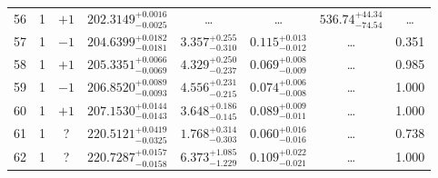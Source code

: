 \begin{table*}[!]
\begin{tabular}{llcrrlrc}
56 & 1 &  $+1$ & $    202.3149_{-      0.0025}^{+      0.0016}$ & \multicolumn{1}{c}{\dots} & \multicolumn{1}{c}{\dots} & $      536.74_{-       74.54}^{+       44.34}$ & \dots \\[1pt]
57 & 1 & $-1$ & $    204.6399_{-      0.0181}^{+      0.0182}$ & $       3.357_{-       0.310}^{+       0.255}$ & $       0.115_{-       0.012}^{+       0.013}$ & \multicolumn{1}{c}{\dots} & 0.351\\[1pt]
58 & 1 & $+1$ & $    205.3351_{-      0.0069}^{+      0.0066}$ & $       4.329_{-       0.237}^{+       0.250}$ & $       0.069_{-       0.009}^{+       0.008}$ & \multicolumn{1}{c}{\dots} & 0.985\\[1pt]
59 & 1 & $-1$ & $    206.8520_{-      0.0093}^{+      0.0089}$ & $       4.556_{-       0.215}^{+       0.231}$ & $       0.074_{-       0.008}^{+       0.006}$ & \multicolumn{1}{c}{\dots} & 1.000\\[1pt]
60 & 1 & $+1$ & $    207.1530_{-      0.0143}^{+      0.0144}$ & $       3.648_{-       0.145}^{+       0.186}$ & $       0.089_{-       0.011}^{+       0.009}$ & \multicolumn{1}{c}{\dots} & 1.000\\[1pt]

61 & 1 & ? & $    220.5121_{-      0.0325}^{+      0.0419}$ & $       1.768_{-       0.303}^{+       0.314}$ & $       0.060_{-       0.016}^{+       0.016}$ & \multicolumn{1}{c}{\dots} & 0.738\\[1pt]
62 & 1 & ? & $    220.7287_{-      0.0158}^{+      0.0157}$ & $       6.373_{-       1.229}^{+       1.085}$ & $       0.109_{-       0.021}^{+       0.022}$ & \multicolumn{1}{c}{\dots} & 1.000\\[1pt]
\hline
\end{tabular}
\end{table*}


